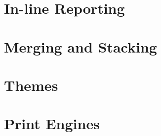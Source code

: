 \hypertarget{in-line-reporting}{%
\section{In-line Reporting}\label{in-line-reporting}}

\hypertarget{merging-and-stacking}{%
\section{Merging and Stacking}\label{merging-and-stacking}}

\hypertarget{themes}{%
\section{Themes}\label{themes}}

\hypertarget{print-engines}{%
\section{Print Engines}\label{print-engines}}



\address{Daniel D. Sjoberg\\
  Memorial Sloan Kettering Cancer Center\\
  1275 York Ave., New York, New York 10022\\
  USA\\
  ORCID 0000-0003-0862-2018\\
  }

\address{Karissa Whiting\\
  Memorial Sloan Kettering Cancer Center\\
  1275 York Ave., New York, New York 10022\\
  USA\\
  ORCID 0000-0002-4683-1868\\
  }

\address{Michael Curry\\
  Memorial Sloan Kettering Cancer Center\\
  1275 York Ave., New York, New York 10022\\
  USA\\
  ORCID 0000-0002-0261-4044\\
  }
